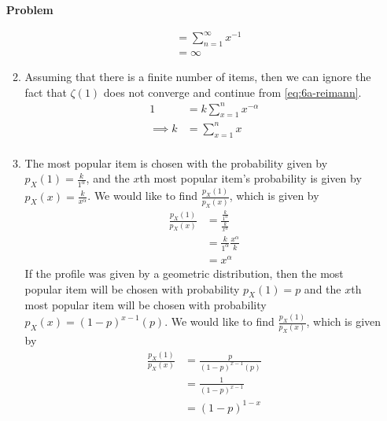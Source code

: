 \documentclass[12pt]{article}
\newenvironment{Ex}{\textbf{Problem}\vspace{.75em}\\}{}
\begin{document}
\begin{enumerate}
\begin{Ex}
\begin{solution}
\begin{enumerate}
\begin{equation}
\begin{aligned}
              &= \sum_{n=1}^\infty x^{-1} \\
              &= \infty
            \end{aligned}
          \end{equation}
        \item Assuming that there is a finite number of items, then we
          can ignore the fact that $\zeta(1)$ does not converge and
          continue from \cref{eq:6a-reimann}.
          \begin{equation}
            \label{eq:6c-sol}
            \begin{aligned}
              1 &= k \sum_{x=1}^n x^{-\alpha} \\
              \implies k &= \sum_{x=1}^n x \\
            \end{aligned}
          \end{equation}
        \item The most popular item is chosen with the probability given
          by $p_X(1) = \frac{k}{1^{\alpha}}$, and the $x$th most
          popular item's probability is given by
          $p_X(x) = \frac{k}{x^{\alpha}}$. We would like to find
          $\frac{p_X(1)}{p_X(x)}$, which is given by
          \begin{equation}
            \label{eq:6d-sol-reg}
            \begin{aligned}
              \frac{p_X(1)}{p_X(x)} &=
              \frac{\frac{k}{1^{\alpha}}}{\frac{k}{x^{\alpha}}} \\
              &= \frac{k}{1^{\alpha}} \frac{x^{\alpha}}{k} \\
              &= x^{\alpha}
            \end{aligned}
          \end{equation}
          If the profile was given by a geometric distribution, then
          the most popular item will be chosen with probability
          $p_X(1) = p$ and the $x$th most popular item will be chosen
          with probability $p_X(x) = (1-p)^{x-1}(p)$. We would like to
          find $\frac{p_X(1)}{p_X(x)}$, which is given by
          \begin{equation}
            \label{eq:6d-sol-geo}
            \begin{aligned}
              \frac{p_X(1)}{p_X(x)} &= \frac{p}{(1-p)^{x-1}(p)} \\
              &= \frac{1}{(1-p)^{x-1}} \\
              &= (1-p)^{1-x} \\

\end{aligned}
\end{equation}
\end{enumerate}
\end{solution}
\end{Ex}
\end{enumerate}
\end{document}
